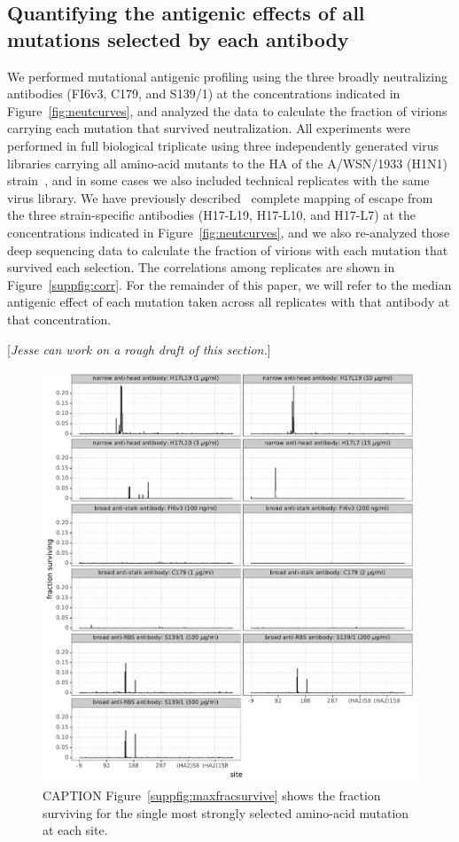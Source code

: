 \documentclass[11pt]{article}
\newcommand{\comment}[1]{{\color{red}[\textsl{#1}]}}
\begin{document}
\subsection*{Quantifying the antigenic effects of all mutations selected by each antibody}
We performed mutational antigenic profiling using the three broadly neutralizing antibodies (FI6v3, C179, and S139/1) at the concentrations indicated in Figure~\ref{fig:neutcurves}, and analyzed the data to calculate the fraction of virions carrying each mutation that survived neutralization. 
All experiments were performed in full biological triplicate using three independently generated virus libraries carrying all amino-acid mutants to the HA of the A/WSN/1933 (H1N1) strain~\citep{doud2016accurate}, and in some cases we also included technical replicates with the same virus library.
We have previously described~\citep{doud2017complete} complete mapping of escape from the three strain-specific antibodies (H17-L19, H17-L10, and H17-L7) at the concentrations indicated in Figure~\ref{fig:neutcurves}, and we also re-analyzed those deep sequencing data to calculate the fraction of virions with each mutation that survived each selection.
The correlations among replicates are shown in Figure~\ref{suppfig:corr}.
For the remainder of this paper, we will refer to the median antigenic effect of each mutation taken across all replicates with that antibody at that concentration.


\comment{Jesse can work on a rough draft of this section.}

\begin{figure}
\centerline{\includegraphics[width=\textwidth]{figs/avgfracsurvive.pdf}}
\caption{
\label{fig:avgfracsurvive}
CAPTION
Figure~\ref{suppfig:maxfracsurvive} shows the fraction surviving for the single most strongly selected amino-acid mutation at each site.
}
\end{figure}
\end{document}
